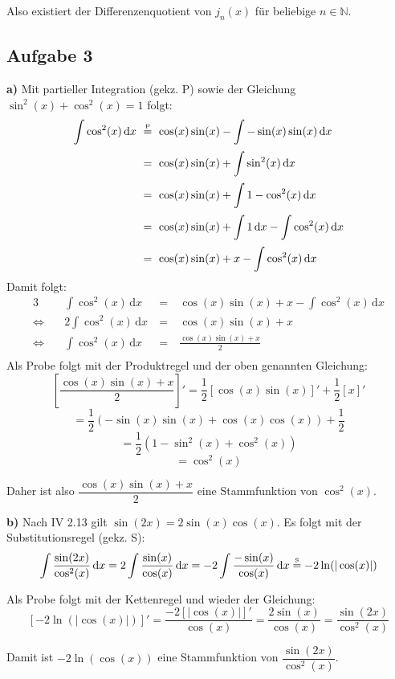 \documentclass[a4paper,graphics,11pt]{article}
\newcommand{\aufgabe}[1]{\subsection*{Aufgabe #1}}
\newcommand{\up}[2]{\mathrel{\overset{\makebox[0pt]{\mbox{\normalfont\tiny #2}}}{#1}}}
\begin{document}
Also existiert der Differenzenquotient von $j_n(x)$ für beliebige $n \in \mathbb{N}$.

\newpage

\aufgabe{3}

\textbf{a)}
Mit partieller Integration (gekz. P) sowie der Gleichung $\sin^2(x)+\cos^2(x) = 1$ folgt:
\begin{alignat*}{2}
    \int \cos^2(x)\, \mathrm{d}x &\ \up{=}{P}\ \cos(x)\sin(x) - \int -\sin(x)\sin(x)\, \mathrm{d}x \\[2pt]
    &\ =\ \cos(x)\sin(x)+\int \sin^2(x)\, \mathrm{d}x \\[2pt]
    &\ =\ \cos(x)\sin(x)+\int 1-\cos^2(x)\, \mathrm{d}x \\[2pt]
    &\ =\ \cos(x)\sin(x)+\int 1\, \mathrm{d}x - \int \cos^2(x)\, \mathrm{d}x \\[2pt]
    &\ =\ \cos(x)\sin(x)+x - \int \cos^2(x)\, \mathrm{d}x
\end{alignat*}
Damit folgt:
\begin{alignat*}{3}
    &\int \cos^2(x)\, \mathrm{d}x &\ =\ &\cos(x)\sin(x)+x - \int \cos^2(x)\, \mathrm{d}x \\[2pt]
    \Longleftrightarrow\quad & 2\int \cos^2(x)\, \mathrm{d}x &\ =\ & \cos(x)\sin(x)+x\\[2pt]
    \Longleftrightarrow\quad & \int \cos^2(x)\, \mathrm{d}x &\ =\ & \frac{\cos(x)\sin(x)+x}{2}\\[2pt]
\end{alignat*}
Als Probe folgt mit der Produktregel und der oben genannten Gleichung:
$$
    \left[\frac{\cos(x)\sin(x)+x}{2}\right]'
    = \frac{1}{2}[\cos(x)\sin(x)]'+\frac{1}{2}[x]'
$$$$
    = \frac{1}{2}(-\sin(x)\sin(x)+\cos(x)\cos(x))+\frac{1}{2}
$$$$
    = \frac{1}{2}(1-\sin^2(x)+\cos^2(x))
$$$$
    = \cos^2(x)
$$

Daher ist also $\dfrac{\cos(x)\sin(x)+x}{2}$ eine Stammfunktion von $\cos^2(x)$.

\textbf{b)}
Nach IV 2.13 gilt $\sin(2x) = 2\sin(x)\cos(x)$. Es folgt mit der Substitutionsregel (gekz. S):
$$
    \int \frac{\sin(2x)}{\cos^2(x)}\, \mathrm{d}x
    = 2\int \frac{\sin(x)}{\cos(x)}\, \mathrm{d}x
    = -2\int \frac{-\sin(x)}{\cos(x)}\, \mathrm{d}x
    \up{=}{S} -2\ln(|\cos(x)|)
$$

Als Probe folgt mit der Kettenregel und wieder der Gleichung:
$$
    [-2\ln(|\cos(x)|)]'
    = \frac{-2[|\cos(x)|]'}{\cos(x)}
    = \frac{2\sin(x)}{\cos(x)}
    = \frac{\sin(2x)}{\cos^2(x)}
$$

Damit ist $-2\ln(\cos(x))$ eine Stammfunktion von $\dfrac{\sin(2x)}{\cos^2(x)}$.
\newpage
\end{document}
